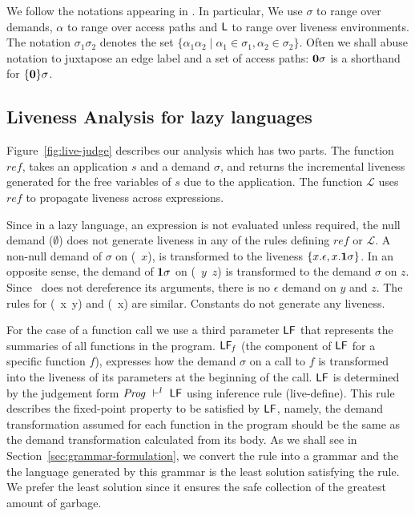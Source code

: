 \documentclass[9pt]{sigplanconf}
\begin{document}
We follow the notations appearing in \cite{asati14lgc}. In particular,
We use $\sigma$  to range over demands, $\alpha$ to  range over access
paths and  $\mathsf{L}$ to  range over  liveness environments.   The notation
$\sigma_1\sigma_2$  denotes  the  set $\lbrace  \alpha_1\alpha_2  \mid
\alpha_1 \in \sigma_1, \alpha_2  \in \sigma_2\rbrace$.  Often we shall
abuse notation to  juxtapose an edge label and a  set of access paths:
$\mathbf{0}\sigma$ is a shorthand for $\lbrace\mathbf{0}\rbrace\sigma$.

\subsection{Liveness Analysis for lazy languages}
\label{sec:liveness-analysis}


Figure~\ref{fig:live-judge}  describes  our  analysis  which  has  two
parts. The function $\mathit{ref}$,  takes  an application $s$ and
a demand $\sigma$, and returns  the incremental liveness generated for the
free  variables   of  $s$  due  to  the   application.   The  function
$\mathcal{L}$  uses   $\mathit{ref}$  to  propagate   liveness  across
expressions.

 Since  in a  lazy language,  an  expression is  not evaluated  unless
 required, the null demand ($\emptyset$) does not generate liveness in
 any  of  the  rules  defining  $\mathit{ref}$  or  $\mathcal{L}$.   A
 non-null  demand of  $\sigma$ on  (\CDR~$x$), is  transformed to  the
 liveness $\{x.\epsilon, x.\mathbf{1}\sigma\}$.  In  an opposite sense, the
 demand  of $\mathbf{1}\sigma$  on  (\CONS~$y$~$z$) is  transformed to  the
 demand  $\sigma$  on $z$.   Since  \CONS\  does not  dereference  its
 arguments, there  is no $\epsilon$ demand  on $y$ and $z$.  The rules
 for (\PRIM~x~y) and (\NULLQ~x) are similar. Constants do not generate
 any liveness.

For the  case of a  function call we  use a third  parameter $\mathsf{LF}$
that  represents  the  summaries  of all  functions  in  the  program.
$\mathsf{LF}_{\mathit  f}$  (the component  of  $\mathsf{LF}$  for a  specific
function $f$), expresses  how the demand $\sigma$ on a  call to $f$ is
transformed into  the liveness of  its parameters at the  beginning of
the   call.    $\mathsf{LF}$  is   determined   by   the  judgement   form
$\mathit{Prog} \ \vdash^l\  \mathsf{LF}$ using inference rule ({\sc live-define}).
This  rule  describes the  fixed-point  property  to be  satisfied  by
$\mathsf{LF}$, namely, the demand transformation assumed for each function
in  the  program should  be  the  same  as the  demand  transformation
calculated    from    its    body.      As    we    shall    see    in
Section~\ref{sec:grammar-formulation},  we  convert  the rule  into  a
grammar and  the the language generated  by this grammar is  the least
solution satisfying  the rule. We  prefer the least solution  since it
ensures the safe collection of the greatest amount of garbage.
\end{document}
